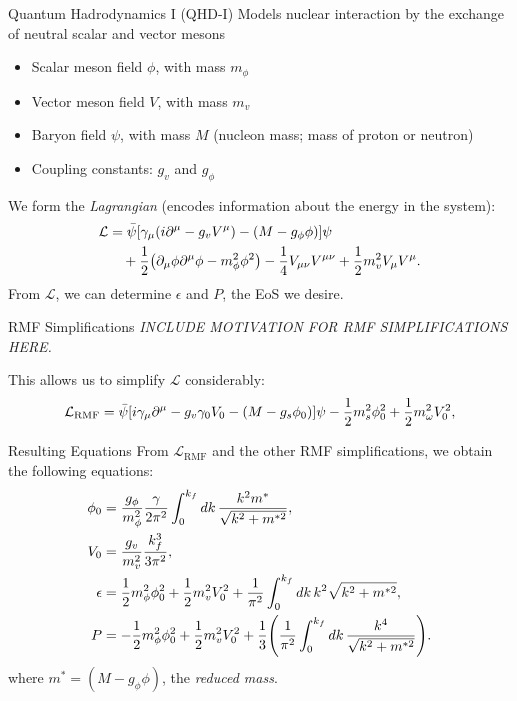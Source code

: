 \documentclass[handout]{beamer}
\newcommand{\Letter}[1]{\mathcal{#1}}
\newcommand{\Lag}{\Letter{L}}
\newcommand{\p}{\partial}
\begin{document}
    \begin{frame}{Quantum Hadrodynamics I (QHD-I)}
        Models nuclear interaction by the exchange of neutral scalar and vector mesons \pause \begin{itemize}
            \item Scalar meson field $\phi$, with mass $m_\phi$ \pause
            \item Vector meson field $V$, with mass $m_v$ \pause
            \item Baryon field $\psi$, with mass $M$ (nucleon mass; mass of proton or neutron) \pause
            \item Coupling constants: $g_v$ and $g_\phi$ \pause
        \end{itemize}
        We form the \textit{Lagrangian} (encodes information about the energy in the system): \pause
        \begin{align*}
            \Lag & = \bar{\psi} \bqty{\gamma_\mu(i\p^\mu -g_v V^\mu) - (M-g_\phi\phi)} \psi \nonumber\\
            & \quad + \frac{1}{2} \pqty{\p_\mu \phi \p^\mu \phi - m_\phi^2 \phi^2} - \frac{1}{4} V_{\mu\nu}V^{\mu\nu} + \frac{1}{2} m_v^2 V_\mu V^\mu.
        \end{align*}\pause
        From $\Lag$, we can determine $\epsilon$ and $P$, the EoS we desire.
    \end{frame}

    \begin{frame}{RMF Simplifications}
        \textit{INCLUDE MOTIVATION FOR RMF SIMPLIFICATIONS HERE.}
        \bigskip

        This allows us to simplify $\Lag$ considerably: \pause
        \begin{align*}
            \Lag_\text{RMF} = \bar\psi \bqty{i\gamma_\mu\p^\mu - g_v \gamma_0 V_0 - (M-g_s\phi_0)} \psi - \frac{1}{2} m_s^2 \phi_0^2 + \frac{1}{2} m_\omega^2 V_0^2,
        \end{align*}

    \end{frame}

    \begin{frame}{Resulting Equations}
        From $\Lag_\text{RMF}$ and the other RMF simplifications, we obtain the following equations: \pause
        \begin{align*}
            \phi_0 &= \frac{g_\phi}{m_\phi^2} \frac{\gamma}{2\pi^2}\int_0^{k_f} \dd{k} \frac{k^2 m^*}{\sqrt{k^2 + m^{*2}}},  \\
            V_0 &= \frac{g_v}{m_v^2} \frac{k_f^3}{3\pi^2}, \\
            \epsilon & = \frac{1}{2} m_\phi^2 \phi_0^2 + \frac{1}{2} m_v^2 V_0^2 + \frac{1}{\pi^2} \int_0^{k_f} \dd{k} k^2 \sqrt{k^2 + m^{*2}},\\
            P & = -\frac{1}{2} m_\phi^2 \phi_0^2 + \frac{1}{2} m_v^2 V_0^2 + \frac{1}{3} \pqty{\frac{1}{\pi^2} \int_0^{k_f} \dd{k}\frac{k^4}{\sqrt{k^2 + m^{*2}}}}.
        \end{align*}
        where $m^* = (M-g_\phi \phi)$, the \textit{reduced mass}.
    \end{frame}
\end{document}
